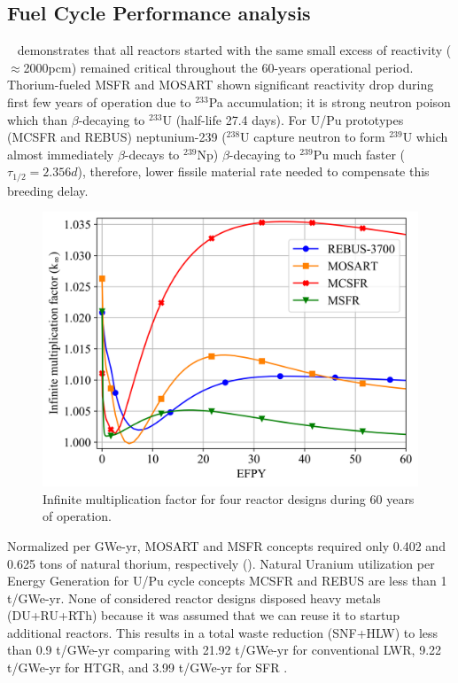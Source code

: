 \documentclass{anstrans}
\begin{document}
\subsection{Fuel Cycle Performance analysis} 
\label{sec:performance}
~ demonstrates that all reactors started with the same small excess of reactivity ($\approx$2000pcm) remained critical throughout the 60-years operational period. Thorium-fueled \gls{MSFR} and \gls{MOSART} shown significant reactivity drop during first few years of operation due to $^{233}$Pa accumulation; it is strong neutron poison which than $\beta$-decaying to $^{233}$U (half-life 27.4 days). For U/Pu prototypes (\gls{MCSFR} and REBUS) neptunium-239 ($^{238}$U capture neutron to form $^{239}$U which almost immediately $\beta$-decays to $^{239}$Np)  $\beta$-decaying to $^{239}$Pu much faster ($\tau_{1/2}=2.356d$), therefore, lower fissile material rate needed to compensate this breeding delay.
\begin{figure}[!htb]
  \centering
  \includegraphics[scale=0.585]{./Figures/k_inf.png}
  \vspace{-0.25in}
  \caption{Infinite multiplication factor for four reactor designs during 60 years of operation.}   
  \label{fig:k_inf}
\end{figure}

Normalized per GWe-yr, \gls{MOSART} and \gls{MSFR} concepts required only 0.402 and 0.625 tons of natural thorium, respectively (). Natural Uranium utilization per Energy Generation for U/Pu cycle concepts \gls{MCSFR} and REBUS are less than 1 t/GWe-yr. None of considered reactor designs disposed heavy metals (\gls{DU}+\gls{RU}+\gls{RTh}) because it was assumed that we can reuse it to startup additional reactors. This results in a total waste reduction (\gls{SNF}+\gls{HLW}) to less than 0.9 t/GWe-yr comparing with 21.92 t/GWe-yr for conventional \gls{LWR}, 9.22 t/GWe-yr for \gls{HTGR}, and 3.99 t/GWe-yr for \gls{SFR} \cite{wigeland_nuclear_2014}. 
\end{document}
